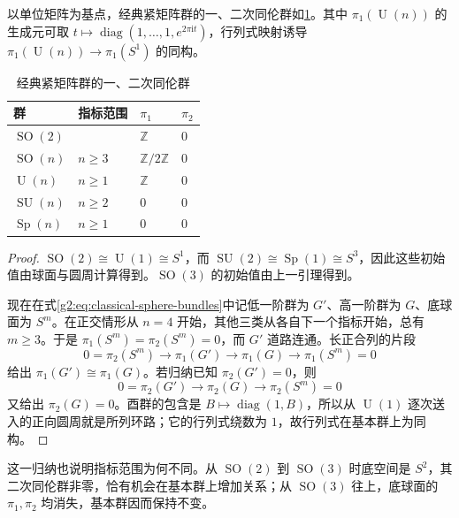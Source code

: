 \begin{proposition}\label{g2:prop:classical-low-homotopy}
	以单位矩阵为基点，经典紧矩阵群的一、二次同伦群如\cref{g2:tab:classical-low-homotopy}。其中 \(\pi_1(\operatorname{U}(n))\) 的生成元可取 \(t\mapsto\operatorname{diag}(1,\ldots,1,e^{2\pi\mathrm{i}t})\)，行列式映射诱导 \(\pi_1(\operatorname{U}(n))\rightarrow\pi_1(S^1)\) 的同构。
\end{proposition}
\begin{table}[htbp]
	\centering
	\caption{经典紧矩阵群的一、二次同伦群}
	\label{g2:tab:classical-low-homotopy}
	\begin{tabular}{llll}
		\toprule
		群 & 指标范围 & \(\pi_1\) & \(\pi_2\)\\
		\midrule
		\(\operatorname{SO}(2)\) & & \(\mathbb Z\) & \(0\)\\
		\(\operatorname{SO}(n)\) & \(n\ge3\) & \(\mathbb Z/2\mathbb Z\) & \(0\)\\
		\(\operatorname{U}(n)\) & \(n\ge1\) & \(\mathbb Z\) & \(0\)\\
		\(\operatorname{SU}(n)\) & \(n\ge2\) & \(0\) & \(0\)\\
		\(\operatorname{Sp}(n)\) & \(n\ge1\) & \(0\) & \(0\)\\
		\bottomrule
	\end{tabular}
\end{table}
\begin{proof}
	\(\operatorname{SO}(2)\cong\operatorname{U}(1)\cong S^1\)，而 \(\operatorname{SU}(2)\cong\operatorname{Sp}(1)\cong S^3\)，因此这些初始值由球面与圆周计算得到。\(\operatorname{SO}(3)\) 的初始值由上一引理得到。

	现在在式\eqref{g2:eq:classical-sphere-bundles}中记低一阶群为 \(G'\)、高一阶群为 \(G\)、底球面为 \(S^m\)。在正交情形从 \(n=4\) 开始，其他三类从各自下一个指标开始，总有 \(m\ge3\)。于是 \(\pi_1(S^m)=\pi_2(S^m)=0\)，而 \(G'\) 道路连通。长正合列的片段
	\[
		0=\pi_2(S^m)\longrightarrow\pi_1(G')\longrightarrow\pi_1(G)\longrightarrow\pi_1(S^m)=0
	\]
	给出 \(\pi_1(G')\cong\pi_1(G)\)。若归纳已知 \(\pi_2(G')=0\)，则
	\[
		0=\pi_2(G')\longrightarrow\pi_2(G)\longrightarrow\pi_2(S^m)=0
	\]
	又给出 \(\pi_2(G)=0\)。酉群的包含是 \(B\mapsto\operatorname{diag}(1,B)\)，所以从 \(\operatorname{U}(1)\) 逐次送入的正向圆周就是所列环路；它的行列式绕数为 \(1\)，故行列式在基本群上为同构。
\end{proof}

这一归纳也说明指标范围为何不同。从 \(\operatorname{SO}(2)\) 到 \(\operatorname{SO}(3)\) 时底空间是 \(S^2\)，其二次同伦群非零，恰有机会在基本群上增加关系；从 \(\operatorname{SO}(3)\) 往上，底球面的 \(\pi_1,\pi_2\) 均消失，基本群因而保持不变。


